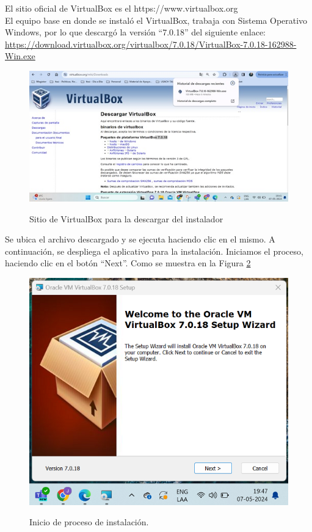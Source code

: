 \documentclass[stu, 11pt, letterpaper, donotrepeattitle, floatsintext, natbib]{apa7}
\begin{document}
El sitio oficial de VirtualBox es el https://www.virtualbox.org \noindent \citep{virtualbox}\\

El equipo base en donde se instaló el VirtualBox, trabaja con Sistema Operativo Windows, por lo que descargó la versión “7.0.18” del siguiente enlace: \url{https://download.virtualbox.org/virtualbox/7.0.18/VirtualBox-7.0.18-162988-Win.exe }

\begin{figure}[H]
    \centering
    \caption{Sitio de VirtualBox para la descargar del instalador}
    \includegraphics[width=0.6\linewidth]{imagenCap2/1.jpg} %
    \label{fig:OverallEffect}
\end{figure}

Se ubica el archivo descargado y se ejecuta haciendo clic en el mismo. A continuación, se despliega el aplicativo para la instalación. 
Iniciamos el proceso, haciendo clic en el botón “Next”. Como se muestra en la Figura \ref{figura2.2}
\hfill \break

\begin{figure}[H]
    \centering
    \caption{Inicio de proceso de instalación.}
    \includegraphics[width=0.5\linewidth]{imagenCap2/2.png} %
    \label{figura2.2}
\end{figure}
\end{document}
